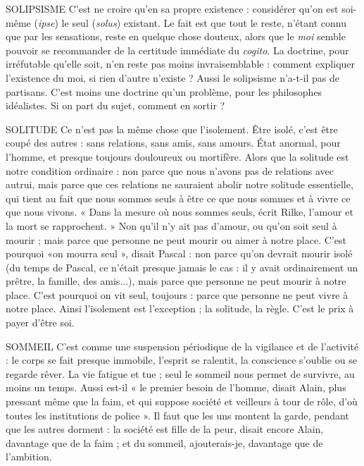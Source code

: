 SOLIPSISME C’est ne croire qu’en sa propre existence : considérer qu’on
est soi-même ({\it ipse}) le seul ({\it solus}) existant. Le fait est que
tout le reste, n’étant connu que par les sensations, reste en quelque chose douteux,
alors que le {\it moi} semble pouvoir se recommander de la certitude immédiate
du {\it cogito}. La doctrine, pour irréfutable qu’elle soit, n’en reste pas moins
invraisemblable : comment expliquer l'existence du moi, si rien d’autre
n'existe ? Aussi le solipsisme n’a-t-il pas de partisans. C’est moins une doctrine
qu’un problème, pour les philosophes idéalistes. Si on part du sujet, comment
en sortir ?

SOLITUDE Ce n’est pas la même chose que l’isolement. Être isolé, c’est être
coupé des autres : sans relations, sans amis, sans amours. État
anormal, pour l’homme, et presque toujours douloureux ou mortifère. Alors
que la solitude est notre condition ordinaire : non parce que nous n'avons pas
de relations avec autrui, mais parce que ces relations ne sauraient abolir notre
solitude essentielle, qui tient au fait que nous sommes seuls à être ce que nous
sommes et à vivre ce que nous vivons. « Dans la mesure où nous sommes seuls,
écrit Rilke, l'amour et la mort se rapprochent. » Non qu’il n’y ait pas d'amour,
ou qu’on soit seul à mourir ; mais parce que personne ne peut mourir ou aimer
à notre place. C’est pourquoi «on mourra seul », disait Pascal : non parce
qu’on devrait mourir isolé (du temps de Pascal, ce n’était presque jamais le cas :
il y avait ordinairement un prêtre, la famille, des amis...), mais parce que personne
ne peut mourir à notre place. C’est pourquoi on vit seul, toujours : parce
que personne ne peut vivre à notre place. Ainsi l'isolement est l'exception ; la
solitude, la règle. C’est le prix à payer d’être soi.

SOMMEIL C’est comme une suspension périodique de la vigilance et de
l’activité : le corps se fait presque immobile, l'esprit se ralentit, la
conscience s’oublie ou se regarde rêver. La vie fatigue et tue ; seul le sommeil
nous permet de survivre, au moins un temps. Aussi est-il « le premier besoin de
l’homme, disait Alain, plus pressant même que la faim, et qui suppose société
et veilleurs à tour de rôle, d’où toutes les institutions de police ». Il faut que les
uns montent la garde, pendant que les autres dorment : la société est fille de la
peur, disait encore Alain, davantage que de la faim ; et du sommeil, ajouterais-je,
davantage que de l’ambition.

